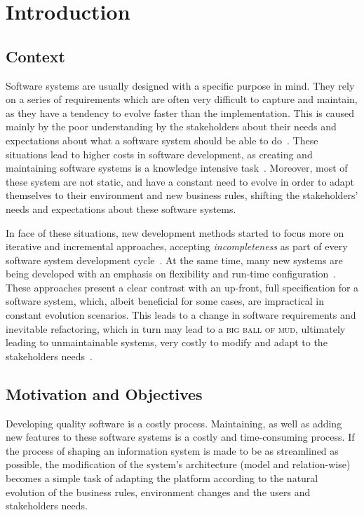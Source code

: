 \chapter{Introduction}\label{chap:intro}

\section{Context}\label{sec:context}

Software systems are usually designed with a specific purpose in mind. They rely on a series of requirements which are often very difficult to capture and maintain, as they have a tendency to evolve faster than the implementation. This is caused mainly by the poor understanding by the stakeholders about their needs and expectations about what a software system should be able to do~\cite{PT07}. These situations lead to higher costs in software development, as creating and maintaining software systems is a knowledge intensive task~\cite{AdOdSBD07}. Moreover, most of these system are not static, and have a constant need to evolve in order to adapt themselves to their environment and new business rules, shifting the stakeholders' needs and expectations about these software systems.

In face of these situations, new development methods started to focus more on iterative and incremental approaches, accepting \emph{incompleteness} as part of every software system development cycle~\cite{WC03}. At the same time, many new systems are being developed with an emphasis on flexibility and run-time configuration~\cite{YJ02}. These approaches present a clear contrast with an up-front, full specification for a software system, which, albeit beneficial for some cases, are impractical in constant evolution scenarios. This leads to a change in software requirements and inevitable refactoring, which in turn may lead to a \textsc{big ball of mud}, ultimately leading to unmaintainable systems, very costly to modify and adapt to the stakeholders needs~\cite{FY97}.

\section{Motivation and Objectives}\label{sec:goals}

Developing quality software is a costly process. Maintaining, as well as adding new features to these software systems is a costly and time-consuming process. If the process of shaping an information system is made to be as streamlined as possible, the modification of the system's architecture (model and relation-wise) becomes a simple task of adapting the platform according to the natural evolution of the business rules, environment changes and the users and stakeholders needs.

